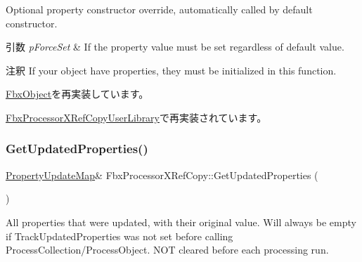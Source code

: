 Optional property constructor override, automatically called by default constructor. 
\begin{DoxyParams}{引数}
{\em p\+Force\+Set} & If the property value must be set regardless of default value. \\
\hline
\end{DoxyParams}
\begin{DoxyRemark}{注釈}
If your object have properties, they must be initialized in this function. 
\end{DoxyRemark}


\hyperlink{class_fbx_object_ad44f814323dc1b5e78bff1bfc608b4bb}{Fbx\+Object}を再実装しています。



\hyperlink{class_fbx_processor_x_ref_copy_user_library_a52eeb515bf8df31ec5d098697fe494b3}{Fbx\+Processor\+X\+Ref\+Copy\+User\+Library}で再実装されています。

\mbox{\label{class_fbx_processor_x_ref_copy_a71fbf7f8e597830ae72f1427894484c4}} 
\subsubsection{\texorpdfstring{Get\+Updated\+Properties()}{GetUpdatedProperties()}}
{\footnotesize\ttfamily \hyperlink{class_fbx_processor_x_ref_copy_af0408f51b60aa6c9fb8aab6e73f57eb7}{Property\+Update\+Map}\& Fbx\+Processor\+X\+Ref\+Copy\+::\+Get\+Updated\+Properties (\begin{DoxyParamCaption}{ }\end{DoxyParamCaption})}

All properties that were updated, with their original value. Will always be empty if Track\+Updated\+Properties was not set before calling Process\+Collection/\+Process\+Object. N\+OT cleared before each processing run. \mbox{\label{class_fbx_processor_x_ref_copy_ada78e119a176edb65c40cbb787699d83}} 
